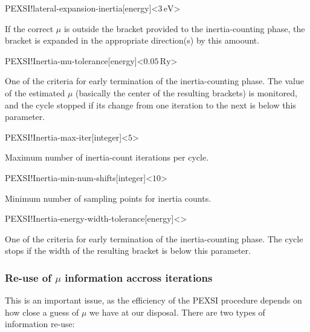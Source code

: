 \begin{fdfentry}{PEXSI!lateral-expansion-inertia}[energy]<$3\,\mathrm{eV}$>

  If the correct $\mu$ is outside the bracket provided to the
  inertia-counting phase, the bracket is expanded in the appropriate
  direction(s) by this amoount.

\end{fdfentry}

\begin{fdfentry}{PEXSI!Inertia-mu-tolerance}[energy]<$0.05\,\mathrm{Ry}$>

  One of the criteria for early termination of the inertia-counting
  phase.  The value of the estimated $\mu$ (basically the center of
  the resulting brackets) is monitored, and the cycle stopped if its
  change from one iteration to the next is below this parameter.
  
\end{fdfentry}

\begin{fdfentry}{PEXSI!Inertia-max-iter}[integer]<$5$>

  Maximum number of inertia-count iterations per cycle.

\end{fdfentry}

\begin{fdfentry}{PEXSI!Inertia-min-num-shifts}[integer]<$10$>
  
  Minimum number of sampling points for inertia counts.

\end{fdfentry}

\begin{fdfentry}{PEXSI!Inertia-energy-width-tolerance}[energy]<>

  One of the criteria for early termination of the inertia-counting
  phase.  The cycle stops if the width of the resulting bracket is
  below this parameter.
  
\end{fdfentry}


\subsubsection{Re-use of $\mu$ information accross iterations}

This is an important issue, as the efficiency of the PEXSI procedure
depends on how close a guess of $\mu$ we have at our
disposal. There are two types of information re-use:

